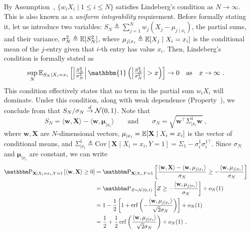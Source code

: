 By Assumption~, $\{ w_i X_i \mid 1 \leq i \leq N \}$ satisfies Lindeberg's condition as $N\to\infty$.
This is also known as a \emph{uniform integrability} requirement.
Before formally stating it, let us introduce two variables: $S_N \triangleq \sum_{j=1}^{N} w_j (X_j - \mu_{j\mid x_i})$, the partial sums, and their variance, $\sigma_N^2 \triangleq \operatorname{\mathbb{E}}[ S_N^2 ]$, where $\mu_{j \mid x_i} \triangleq \operatorname{\mathbb{E}}[X_j \mid X_i = x_i]$ is the conditional mean of the $j$-entry given that $i$-th entry has value $x_i$.
Then, Lindeberg's condition is formally stated as
\begin{equation*}
  \sup_N \E_{S_N \mid X_i = x_i} \left[ \left| \tfrac{S_N^2}{\sigma_N^2} \right| \mathbbm{1} \left( \left| \tfrac{S_N^2}{\sigma_N^2} \right| > x \right) \right] \to 0 \quad \text{as} \quad x\to\infty~.
\end{equation*}
This condition effectively states that no term in the partial sum $w_i X_i$ will dominate.
Under this condition, along with weak dependence (Property~), we conclude from \cite[Theorems 1.19, 10.2]{bradley2007introduction} that $S_N / \sigma_N \overset{d}{\to} \operatorname{\mathcal{N}}(0,1)$.
Note that
\begin{equation*}
    S_N = \langle \mathbf{w}, \mathbf{X} \rangle - \langle \mathbf{w}, \mathbf{\mu}_{\mid x_i} \rangle \qquad  \text{and} \qquad \sigma_N = \sqrt{\mathbf{w}^\top \Sigma_{\mid x_i}^{1} \mathbf{w}}~,
\end{equation*}
where $\mathbf{w}, \mathbf{X}$ are $N$-dimensional vectors, $\mathbf{\mu}_{\mid x_i} = \operatorname{\mathbb{E}}[\mathbf{X} \mid X_i = x_i]$ is the vector of conditional means, and $\Sigma_{\mid x_i}^{1} \triangleq \text{Cov}[\mathbf{X} \mid X_i = x_i, Y = 1] = \Sigma_1 - \sigma_i^1 \sigma_i^{1\top}$.
Since $\sigma_N$ and $\mathbf{\mu}_{\mid x_i}$ are constant, we can write
\begin{align*}
    \PR_{\mathbf{X} \mid X_i = x_i, Y = 1} \left[  \langle \mathbf{w}, \mathbf{X} \rangle \geq 0 \right]
    &= \PR_{\mathbf{X} \mid X_i, Y = 1} \left[ \frac{ \langle \mathbf{w}, \mathbf{X} \rangle - \langle \mathbf{w}, \mathbf{\mu}_{j \mid x_i} \rangle }{ \sigma_N } \geq -\frac{\langle \mathbf{w}, \mathbf{\mu}_{j \mid x_i} \rangle }{ \sigma_N } \right] \\
    &= \PR_{Z \sim \NN(0,1)} \left[ Z \geq -\frac{\langle \mathbf{w}, \mathbf{\mu}_{j \mid x_i} \rangle }{ \sigma_N } \right] + o_N(1) \\
    &= 1 - \frac{1}{2} \left[ 1 + \operatorname{erf}\left( -\frac{\langle \mathbf{w}, \mathbf{\mu}_{j \mid x_i} \rangle }{ \sqrt{2} \sigma_N } \right) \right] + o_N(1) \\
    &= \frac{1}{2} + \frac{1}{2} \operatorname{erf}\left(\frac{\langle \mathbf{w}, \mathbf{\mu}_{j \mid x_i} \rangle }{ \sqrt{2} \sigma_N } \right) + o_N(1)~,
\end{align*}
